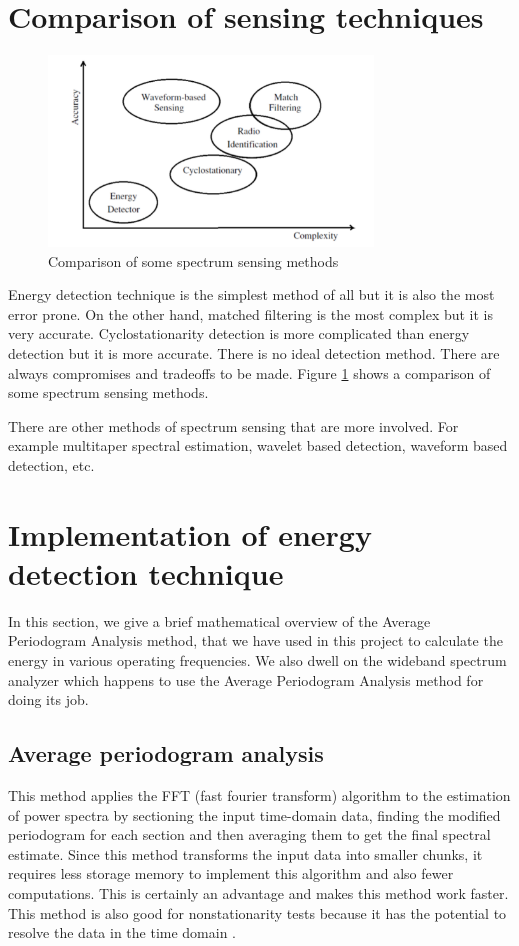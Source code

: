 \section{Comparison of sensing techniques}

\begin{figure}
\centering
\includegraphics[width=0.77\textwidth]{../images/compareSensing}
\caption[Comparison of sensing methods]{Comparison of some spectrum sensing 
methods}
\label{compareSensing}
\end{figure}

Energy detection technique is the simplest method of all but it is also the 
most error prone. On the other hand, matched filtering is the most complex but 
it is very accurate. Cyclostationarity detection is more complicated than 
energy detection but it is more accurate. There is no ideal detection method.
There are always compromises and tradeoffs to be made. Figure 
\ref{compareSensing} shows a comparison of some spectrum sensing methods.

There are other methods of spectrum sensing that are more involved. For
example multitaper spectral estimation, wavelet based detection, waveform
based detection, etc.


\section{Implementation of energy detection technique}

In this section, we give a brief mathematical overview of the Average 
Periodogram Analysis method, that we have used in this project to calculate 
the energy in various operating frequencies. We also dwell on the wideband 
spectrum analyzer which happens to use the Average Periodogram Analysis 
method for doing its job.

\subsection{Average periodogram analysis}
This method applies the FFT (fast fourier transform) algorithm to the 
estimation of power spectra by sectioning the input time-domain data, finding
the modified periodogram for each section and then averaging them to get the
final spectral estimate. Since this method transforms the input data into 
smaller chunks, it requires less storage memory to implement this algorithm 
and also fewer computations. This is certainly an advantage and makes this 
method work faster. This method is also good for nonstationarity tests because
it has the potential to resolve the data in the time domain \cite{welch67}.

